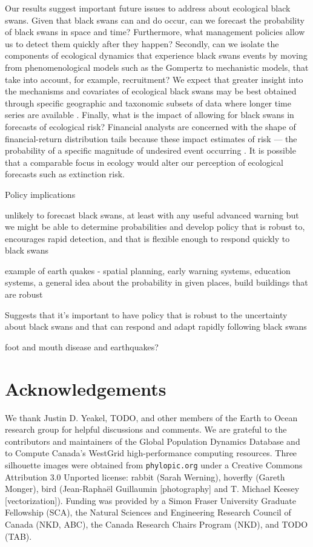 Our results suggest important future issues to address about ecological black
swans. Given that black swans can and do occur, can we forecast the probability
of black swans in space and time? Furthermore, what management policies allow
us to detect them quickly after they happen? Secondly, can we isolate the
components of ecological dynamics that experience black swans events by moving
from phenomenological models such as the Gompertz to mechanistic models, that
take into account, for example, recruitment? We expect that greater insight
into the mechanisms and covariates of ecological black swans may be best
obtained through specific geographic and taxonomic subsets of data where longer
time series are available \citep[e.g.][]{segura2013}. Finally, what is the
impact of allowing for black swans in forecasts of ecological risk? Financial
analysts are concerned with the shape of financial-return distribution tails
because these impact estimates of risk --- the probability of a specific
magnitude of undesired event occurring \citep{rachev2008}. It is possible that
a comparable focus in ecology would alter our perception of ecological
forecasts such as extinction risk.

Policy implications

unlikely to forecast black swans, at least with any useful advanced warning
but we might be able to determine probabilities and develop policy that is
robust to, encourages rapid detection, and that is flexible enough to respond
quickly to black swans

example of earth quakes - spatial planning, early warning systems, education
systems, a general idea about the probability in given places, build buildings
that are robust

Suggests that it's important to have policy that is robust to the uncertainty
about black swans and that can respond and adapt rapidly following black swans

foot and mouth disease and earthquakes?

\section{Acknowledgements}

We thank Justin D. Yeakel, TODO, and other members of the Earth to Ocean
research group for helpful discussions and comments. We are grateful to the
contributors and maintainers of the Global Population Dynamics Database and to
Compute Canada's WestGrid high-performance computing resources. Three
silhouette images were obtained from \texttt{phylopic.org} under a Creative
Commons Attribution 3.0 Unported license: rabbit (Sarah Werning), hoverfly
(Gareth Monger), bird (Jean-Raphaël Guillaumin {[}photography{]} and T.
Michael Keesey {[}vectorization{]}). Funding was provided by a Simon Fraser
University Graduate Fellowship (SCA), the Natural Sciences and Engineering
Research Council of Canada (NKD, ABC), the Canada Research Chairs Program
(NKD), and TODO (TAB).

